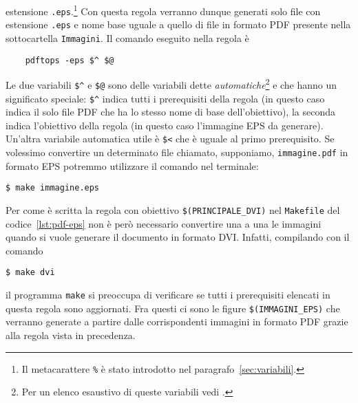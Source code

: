 estensione
\texttt{.eps}.\footnote{Il metacarattere \texttt{\%} è stato introdotto nel
  paragrafo~\ref{sec:variabili}.}
Con questa regola verranno dunque generati solo file con estensione
\texttt{.eps} e nome base uguale a quello di file in formato \textsc{PDF}
presente nella sottocartella \texttt{Immagini}.  Il comando eseguito nella
regola è
\begin{lstlisting}
	pdftops -eps $^ $@
\end{lstlisting}
Le due variabili \texttt{\$\^} e \texttt{\$@} sono delle variabili dette
\emph{automatiche}\footnote{Per un elenco esaustivo di queste variabili vedi
  \cite[pagina 112]{gnu:make}.}
e che hanno un significato speciale: \texttt{\$\^} indica tutti i prerequisiti
della regola (in questo caso indica il solo file \textsc{PDF} che ha lo stesso
nome di base dell'obiettivo), la seconda indica l'obiettivo della regola (in
questo caso l'immagine \textsc{EPS} da generare).  Un'altra variabile automatica
utile è \texttt{\$<} che è uguale al primo prerequisito.  Se volessimo
convertire un determinato file chiamato, supponiamo, \texttt{immagine.pdf} in
formato \textsc{EPS} potremmo utilizzare il comando nel terminale:
\begin{verbatim}
$ make immagine.eps
\end{verbatim}
Per come è scritta la regola con obiettivo \texttt{\$(PRINCIPALE\_DVI)} nel
\texttt{Makefile} del codice~\ref{lst:pdf-eps} non è però necessario convertire
una a una le immagini quando si vuole generare il documento in formato
\textsc{DVI}.  Infatti, compilando con il comando
\begin{verbatim}
$ make dvi
\end{verbatim}
il programma \texttt{make} si preoccupa di verificare se tutti i prerequisiti
elencati in questa regola sono aggiornati.  Fra questi ci sono le figure
\texttt{\$(IMMAGINI\_EPS)} che verranno generate a partire dalle corrispondenti
immagini in formato \textsc{PDF} grazie alla regola vista in precedenza.


